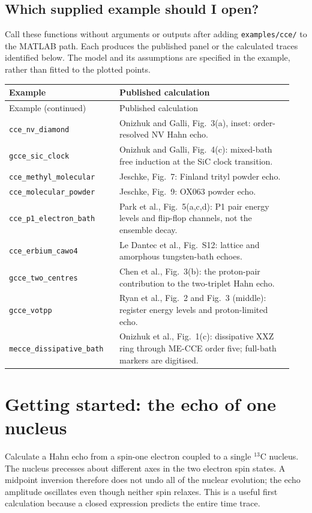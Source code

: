 \documentclass[11pt,a4paper]{article}
\begin{document}
\subsection{Which supplied example should I open?}
Call these functions without arguments or outputs after adding \lstinline|examples/cce/| to the MATLAB path. Each produces the published panel or the calculated traces identified below. The model and its assumptions are specified in the example, rather than fitted to the plotted points.
\begin{longtable}{@{}p{0.36\linewidth}p{0.58\linewidth}@{}}
\toprule Example & Published calculation \\ \midrule\endfirsthead
\toprule Example (continued) & Published calculation \\ \midrule\endhead
\texttt{cce\_nv\_diamond} & Onizhuk and Galli, Fig.~3(a), inset: order-resolved NV Hahn echo. \\
\texttt{gcce\_sic\_clock} & Onizhuk and Galli, Fig.~4(c): mixed-bath free induction at the SiC clock transition. \\
\texttt{cce\_methyl\_molecular} & Jeschke, Fig.~7: Finland trityl powder echo. \\
\texttt{cce\_molecular\_powder} & Jeschke, Fig.~9: OX063 powder echo. \\
\texttt{cce\_p1\_electron\_bath} & Park et al., Fig.~5(a,c,d): P1 pair energy levels and flip-flop channels, not the ensemble decay. \\
\texttt{cce\_erbium\_cawo4} & Le Dantec et al., Fig.~S12: lattice and amorphous tungsten-bath echoes. \\
\texttt{gcce\_two\_centres} & Chen et al., Fig.~3(b): the proton-pair contribution to the two-triplet Hahn echo. \\
\texttt{gcce\_votpp} & Ryan et al., Fig.~2 and Fig.~3 (middle): register energy levels and proton-limited echo. \\
\texttt{mecce\_dissipative\_bath} & Onizhuk et al., Fig.~1(c): dissipative XXZ ring through ME-CCE order five; full-bath markers are digitised. \\
\bottomrule\end{longtable}

\section{Getting started: the echo of one nucleus}\label{sec:start}

Calculate a Hahn echo from a spin-one electron coupled to a single $^{13}$C nucleus. The nucleus precesses about different axes in the two electron spin states. A midpoint inversion therefore does not undo all of the nuclear evolution; the echo amplitude oscillates even though neither spin relaxes. This is a useful first calculation because a closed expression predicts the entire time trace.
\end{document}

